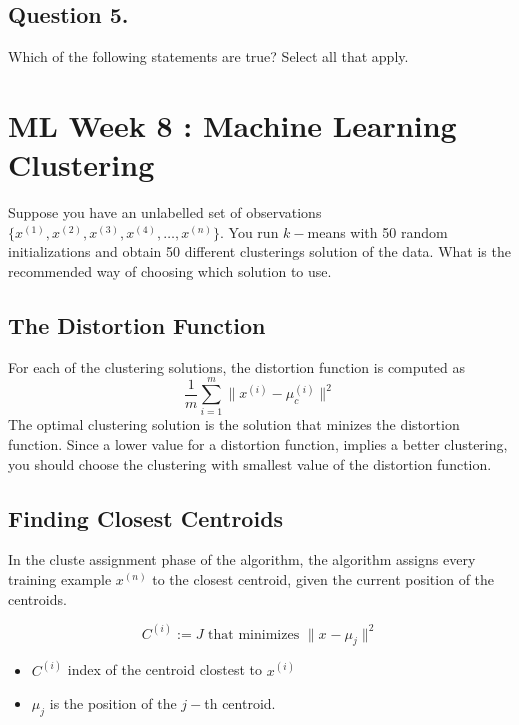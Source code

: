 \subsection*{Question 5. }
Which of the following statements are true? Select all that apply.


\newpage
\section{ML Week 8 : Machine Learning Clustering}

Suppose you have an unlabelled set of observations$\{ x^{(1)},x^{(2)},x^{(3)},x^{(4)}, \ldots ,x^{(n)}\}$.
You run $k-$means with 50 random initializations and obtain 50 different clusterings solution of the data.
What is the recommended way of choosing which solution to use.

\subsection{The Distortion Function}
For each of the clustering solutions, the distortion function is computed as 
\[ \frac{1}{m} \sum^{m}_{i=1} \parallel x^{(i)} - \mu_c^{(i)}\parallel ^2 \]
The optimal clustering solution is the solution that minizes the distortion function.
Since a lower value for a distortion function, implies a better clustering, you should choose the clustering with 
smallest value of the distortion function.
\subsection*{Finding Closest Centroids}

In the cluste assignment phase of the algorithm, the algorithm assigns every training example $x^{(n)}$ to the closest 
centroid, given the current position of the centroids.

\[ C^{(i)} := J \mbox{ that minimizes } \| x^{} - \mu_j \| ^2 \]

\begin{itemize}
\item $C^{(i)}$ index of the centroid clostest to $x^{(i)}$
\item $\mu_j$ is the position of the $j-$th centroid.
\end{itemize}

